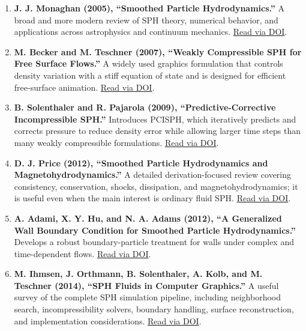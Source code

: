 \documentclass[11pt]{article}
\begin{document}
\begin{enumerate}
    \item \textbf{J. J. Monaghan (2005), ``Smoothed Particle Hydrodynamics.''}
    A broad and more modern review of SPH theory, numerical behavior, and
    applications across astrophysics and continuum mechanics.
    \href{https://doi.org/10.1088/0034-4885/68/8/R01}{Read via DOI}.

    \item \textbf{M. Becker and M. Teschner (2007), ``Weakly Compressible SPH
    for Free Surface Flows.''} A widely used graphics formulation that controls
    density variation with a stiff equation of state and is designed for
    efficient free-surface animation.
    \href{https://doi.org/10.2312/SCA/SCA07/209-217}{Read via DOI}.

    \item \textbf{B. Solenthaler and R. Pajarola (2009), ``Predictive-Corrective
    Incompressible SPH.''} Introduces PCISPH, which iteratively predicts and
    corrects pressure to reduce density error while allowing larger time steps
    than many weakly compressible formulations.
    \href{https://doi.org/10.1145/1576246.1531346}{Read via DOI}.

    \item \textbf{D. J. Price (2012), ``Smoothed Particle Hydrodynamics and
    Magnetohydrodynamics.''} A detailed derivation-focused review covering
    consistency, conservation, shocks, dissipation, and magnetohydrodynamics;
    it is useful even when the main interest is ordinary fluid SPH.
    \href{https://doi.org/10.1016/j.jcp.2010.12.011}{Read via DOI}.

    \item \textbf{A. Adami, X. Y. Hu, and N. A. Adams (2012), ``A Generalized
    Wall Boundary Condition for Smoothed Particle Hydrodynamics.''} Develops a
    robust boundary-particle treatment for walls under complex and
    time-dependent flows.
    \href{https://doi.org/10.1016/j.jcp.2012.05.005}{Read via DOI}.

    \item \textbf{M. Ihmsen, J. Orthmann, B. Solenthaler, A. Kolb, and
    M. Teschner (2014), ``SPH Fluids in Computer Graphics.''} A useful survey
    of the complete SPH simulation pipeline, including neighborhood search,
    incompressibility solvers, boundary handling, surface reconstruction, and
    implementation considerations.
    \href{https://doi.org/10.1109/TVCG.2014.2309246}{Read via DOI}.
\end{enumerate}
\end{document}
